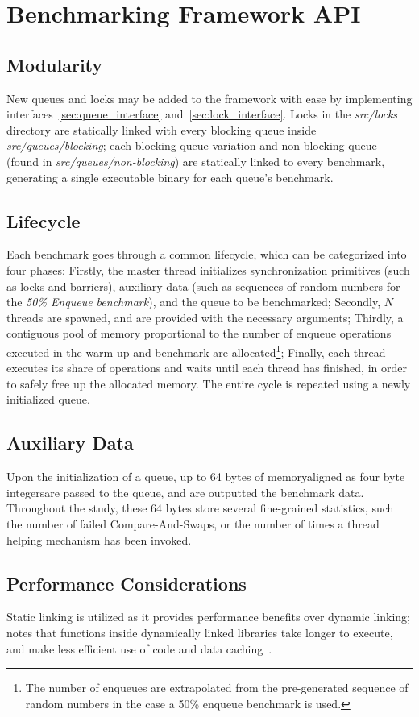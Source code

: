 \section{Benchmarking Framework API}
\subsection{Modularity}
New queues and locks may be added to the framework with ease by implementing
interfaces~\ref{sec:queue_interface} and~\ref{sec:lock_interface}. Locks in the
\emph{src/locks} directory are statically linked with every blocking queue
inside \emph{src/queues/blocking}; each blocking
queue variation and non-blocking queue (found in
\emph{src/queues/non-blocking}) are statically linked to every benchmark,
generating a single executable binary for each queue's benchmark. 

\subsection{Lifecycle}
Each benchmark goes through a common lifecycle, which can be categorized into
four phases: 
Firstly, the master thread initializes synchronization primitives
(such as locks and barriers), auxiliary data (such as
sequences of random numbers for the \emph{50\% Enqueue benchmark}), and the
queue to be benchmarked; 
Secondly, $N$ threads are spawned, and are provided
with the necessary arguments;
Thirdly, a contiguous pool of memory proportional
to the number of enqueue operations executed in the warm-up and benchmark are
allocated\footnote{The number of enqueues are extrapolated from the
pre-generated sequence of random numbers in the case a 50\% enqueue benchmark
is used.};
Finally, each thread executes its share of operations and waits until each
thread has finished, in order to safely free up the allocated memory. The
entire cycle is repeated using a newly initialized queue.

\subsection{Auxiliary Data}
Upon the initialization of a queue, up to 64 bytes of memory\textemdash aligned as four
byte integers\textemdash are passed to the queue, and are outputted
the benchmark data. Throughout the study, these 64
bytes store several fine-grained statistics, such the number of failed Compare-And-Swaps,
or the number of times a thread helping mechanism has been invoked.

\subsection{Performance Considerations}
Static linking is utilized as it provides performance benefits over dynamic
linking; \citeauthor{fog2020optimizing} notes that functions inside dynamically
linked libraries take longer to execute, and make less efficient use of code
and data caching~\citep[Section~14.11]{fog2020optimizing}.


